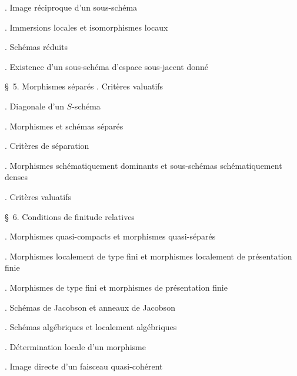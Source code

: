 \noindent{}. Image réciproque d'un sous-schéma\dotfill

\noindent{}. Immersions locales et isomorphismes locaux\dotfill

\noindent{}. Schémas réduits\dotfill

\noindent{}. Existence d'un sous-schéma d'espace sous-jacent donné\dotfill

\noindent\quad \S\ 5. Morphismes séparés . Critères valuatifs\dotfill

\noindent{}. Diagonale d'un $S$-schéma\dotfill

\noindent{}. Morphismes et schémas séparés\dotfill

\noindent{}. Critères de séparation\dotfill

\noindent{}. Morphismes schématiquement dominants et sous-schémas schématiquement denses\dotfill

\noindent{}. Critères valuatifs\dotfill

\noindent\quad \S\ 6. Conditions de finitude relatives\dotfill

\noindent{}. Morphismes quasi-compacts et morphismes quasi-séparés\dotfill

\noindent{}. Morphismes localement de type fini et morphismes localement de présentation finie\dotfill

\noindent{}. Morphismes de type fini et morphismes de présentation finie\dotfill{}

\noindent{}. Schémas de Jacobson et anneaux de Jacobson\dotfill

\noindent{}. Schémas algébriques et localement algébriques\dotfill

\noindent{}. Détermination locale d'un morphisme\dotfill

\noindent{}. Image directe d'un faisceau quasi-cohérent\dotfill


